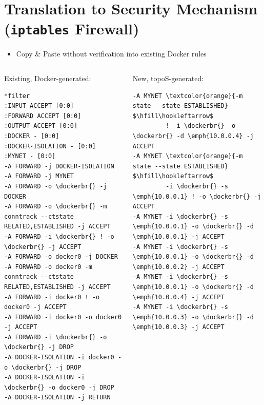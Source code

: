 \section{Translation to Security Mechanism (\texttt{iptables} Firewall)}
\begin{frame}[fragile]
	\begin{itemize}
		\item Copy \& Paste without verification into existing Docker rules
	\end{itemize}
	\begin{footnotesize}
	\begin{columns}[t]
	\begin{column}{0.52\textwidth}%
	Existing, Docker-generated:
	\begin{Verbatim}[commandchars=\\\{\},codes={\catcode`$=3\catcode`^=7}]
*filter
:INPUT ACCEPT [0:0]
:FORWARD ACCEPT [0:0]
:OUTPUT ACCEPT [0:0]
:DOCKER - [0:0]
:DOCKER-ISOLATION - [0:0]
:MYNET - [0:0]
-A FORWARD -j DOCKER-ISOLATION
-A FORWARD -j MYNET
-A FORWARD -o \dockerbr{} -j DOCKER
-A FORWARD -o \dockerbr{} -m conntrack --ctstate RELATED,ESTABLISHED -j ACCEPT
-A FORWARD -i \dockerbr{} ! -o \dockerbr{} -j ACCEPT
-A FORWARD -o docker0 -j DOCKER
-A FORWARD -o docker0 -m conntrack --ctstate RELATED,ESTABLISHED -j ACCEPT
-A FORWARD -i docker0 ! -o docker0 -j ACCEPT
-A FORWARD -i docker0 -o docker0 -j ACCEPT
-A FORWARD -i \dockerbr{} -o \dockerbr{} -j DROP
-A DOCKER-ISOLATION -i docker0 -o \dockerbr{} -j DROP
-A DOCKER-ISOLATION -i \dockerbr{} -o docker0 -j DROP
-A DOCKER-ISOLATION -j RETURN
\end{Verbatim}
	\end{column}
	\begin{column}{0.48\textwidth}
	New, topoS-generated:
	\begin{Verbatim}[commandchars=\\\{\},codes={\catcode`$=3\catcode`^=7}]
-A MYNET \textcolor{orange}{-m state --state ESTABLISHED} $\hfill\hookleftarrow$
         ! -i \dockerbr{} -o \dockerbr{} -d \emph{10.0.0.4} -j ACCEPT
-A MYNET \textcolor{orange}{-m state --state ESTABLISHED} $\hfill\hookleftarrow$
         -i \dockerbr{} -s \emph{10.0.0.1} ! -o \dockerbr{} -j ACCEPT
-A MYNET -i \dockerbr{} -s \emph{10.0.0.1} -o \dockerbr{} -d \emph{10.0.0.1} -j ACCEPT
-A MYNET -i \dockerbr{} -s \emph{10.0.0.1} -o \dockerbr{} -d \emph{10.0.0.2} -j ACCEPT
-A MYNET -i \dockerbr{} -s \emph{10.0.0.1} -o \dockerbr{} -d \emph{10.0.0.4} -j ACCEPT
-A MYNET -i \dockerbr{} -s \emph{10.0.0.3} -o \dockerbr{} -d \emph{10.0.0.3} -j ACCEPT

\end{Verbatim}
\end{column}
\end{columns}
\end{footnotesize}
\end{frame}
